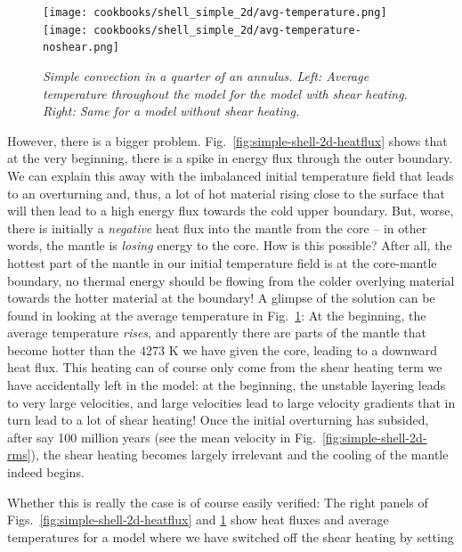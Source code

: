 \documentclass{article}
\begin{document}
\begin{figure}[tb]
  \texttt{[image: cookbooks/shell\_simple\_2d/avg-temperature.png]}
  \hfill
  \texttt{[image: cookbooks/shell\_simple\_2d/avg-temperature-noshear.png]}
  \caption{\it Simple convection in a quarter of an annulus. Left: Average
  temperature throughout the model for the
  model with shear heating. Right: Same for a model without shear heating.}
  \label{fig:simple-shell-2d-temperature}
\end{figure}

However, there is a bigger problem. Fig.~\ref{fig:simple-shell-2d-heatflux}
shows that at the very beginning, there is a spike in energy flux through the
outer boundary. We can explain this away with the imbalanced initial temperature
field that leads to an overturning and, thus, a lot of hot material rising close
to the surface that will then lead to a high energy flux towards the cold upper
boundary. But, worse, there is initially a \textit{negative} heat flux into the
mantle from the core -- in other words, the mantle is \textit{losing} energy to
the core. How is this possible? After all, the hottest part of the mantle in our
initial temperature field is at the core-mantle boundary, no thermal energy
should be flowing from the colder overlying material towards the hotter material
at the boundary! A glimpse of the solution can be found in looking at the
average temperature in Fig.~\ref{fig:simple-shell-2d-temperature}: At the
beginning, the average temperature \textit{rises}, and apparently there are
parts of the mantle that become hotter than the 4273 K we have given the core,
leading to a downward heat flux. This heating can of course only come from the
shear heating term we have accidentally left in the model: at the beginning, the
unstable layering leads to very large velocities, and large velocities lead to
large velocity gradients that in turn lead to a lot of shear heating! Once the
initial overturning has subsided, after say 100 million years (see the mean
velocity in Fig.~\ref{fig:simple-shell-2d-rms}), the shear heating becomes
largely irrelevant and the cooling of the mantle indeed begins.

Whether this is really the case is of course easily verified: The right panels
of Figs.~\ref{fig:simple-shell-2d-heatflux}
and \ref{fig:simple-shell-2d-temperature} show heat fluxes and average
temperatures for a model where we have switched off the shear heating by setting


\end{document}
